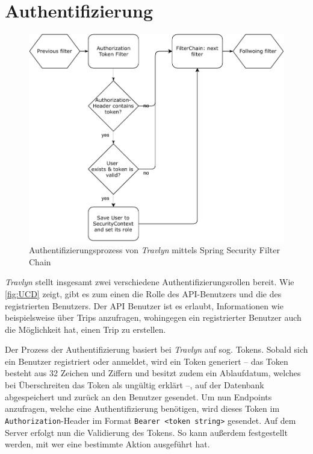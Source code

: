 	\section{Authentifizierung}
	
		\begin{figure}[ht!]
			\centering
			\includegraphics[width=1\textwidth]{images/authorization-flow-chart.pdf}
			\caption{Authentifizierungsprozess von \textit{Travlyn} mittels Spring Security Filter Chain}
			\label{fig:authenticationProcess}
		\end{figure} 
		
		\textit{Travlyn} stellt insgesamt zwei verschiedene Authentifizierungsrollen bereit. Wie \autoref{fig:UCD} zeigt, gibt es zum einen die Rolle des \acs{API}-Benutzers und die des registrierten Benutzers. Der API Benutzer ist es erlaubt, Informationen wie beispielsweise über Trips anzufragen, wohingegen ein registrierter Benutzer auch die Möglichkeit hat, einen Trip zu erstellen. 
		
		Der Prozess der Authentifizierung basiert bei \textit{Travlyn} auf sog. Tokens. Sobald sich ein Benutzer registriert oder anmeldet, wird ein Token generiert -- das Token besteht aus 32 Zeichen und Ziffern und besitzt zudem ein Ablaufdatum, welches bei Überschreiten das Token als ungültig erklärt --, auf der Datenbank abgespeichert und zurück an den Benutzer gesendet. Um nun Endpoints anzufragen, welche eine Authentifizierung benötigen, wird dieses Token im \lstinline|Authorization|-Header im Format \lstinline|Bearer <token string>| gesendet. Auf dem Server erfolgt nun die Validierung des Tokens. So kann außerdem festgestellt werden, mit wer eine bestimmte Aktion ausgeführt hat. 
		
